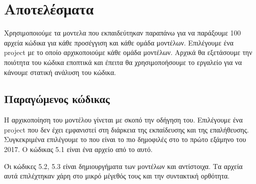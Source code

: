 \section{Αποτελέσματα}

Χρησιμοποιούμε τα μοντελα που εκπαιδεύτηκαν παραπάνω για να παράξουμε 100 αρχεία κώδικα για κάθε προσέγγιση και κάθε ομάδα μοντέλων.
Επιλέγουμε ένα  project με το οποίο αρχικοποιούμε κάθε ομάδα μοντέλων. 
Αρχικά θα εξετάσουμε την ποιότητα του κώδικα εποπτικά και έπειτα θα χρησιμοποήσουμε το εργαλείο  για να κάνουμε στατική ανάλυση του κώδικα.

\subsection{ Παραγώμενος κώδικας}

Η αρχικοποίηση του μοντέλου γίνεται με σκοπό την οδήγηση του.
Επιλέγουμε ένα project που δεν έχει εμφανιστεί στη διάρκεια της εκπαίδευσης και της επαλήθευσης.
Συγκεκριμένα επιλέγουμε το  που είναι το πιο δημοφιλές  στο  το πρώτο εξάμηνο του 2017.
Ο κώδικας 5.1 είναι ένα αρχείο από το  αυτό.



Όι κώδικες 5.2, 5.3 είναι δημιουργήματα των μοντέλων  και  αντίστοιχα. Τα αρχεία αυτά επιλέχτηκαν χάρη στο μικρό μέγεθός τους και την συντακτική ορθότητα.



